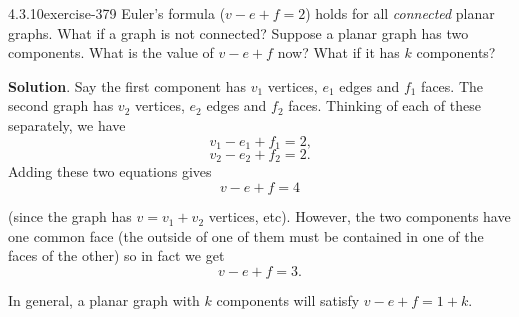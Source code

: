 \documentclass[twoside,11pt,]{book}
\numberwithin{equation}{chapter}
\begin{document}
\begin{divisionsolution}{4.3.10}{}{exercise-379}%
\hypertarget{p-4709}{}%
Euler's formula (\(v - e + f = 2\)) holds for all \emph{connected} planar graphs. What if a graph is not connected? Suppose a planar graph has two components. What is the value of \(v - e + f\) now? What if it has \(k\) components?%
\par\smallskip%
\noindent\textbf{Solution}.\quad%
\hypertarget{p-4710}{}%
Say the first component has \(v_1\) vertices, \(e_1\) edges and \(f_1\) faces. The second graph has \(v_2\) vertices, \(e_2\) edges and \(f_2\) faces. Thinking of each of these separately, we have%
\begin{equation*}
v_1 - e_1 + f_1 = 2\text{,}
\end{equation*}
%
%
\begin{equation*}
v_2 - e_2 + f_2 = 2\text{.}
\end{equation*}
\hypertarget{p-4711}{}%
Adding these two equations gives%
\begin{equation*}
v - e + f = 4
\end{equation*}
%
\par
\hypertarget{p-4712}{}%
(since the graph has \(v = v_1 + v_2\) vertices, etc). However, the two components have one common face (the outside of one of them must be contained in one of the faces of the other) so in fact we get%
\begin{equation*}
v - e + f = 3\text{.}
\end{equation*}
%
\par
\hypertarget{p-4713}{}%
In general, a planar graph with \(k\) components will satisfy \(v - e + f = 1 + k\).%
\end{divisionsolution}%
\end{document}
